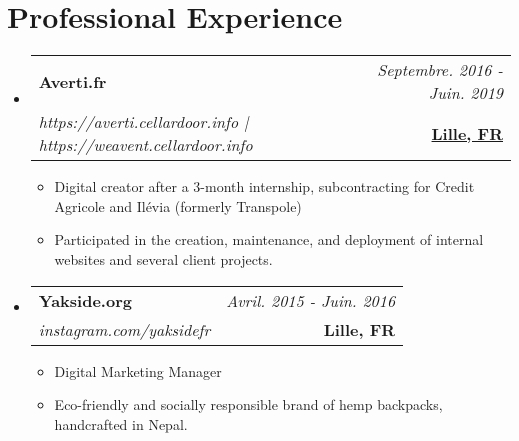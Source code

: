 \documentclass[a4paper,11pt]{article}
\makeatletter
\newcommand{\resumeProject}[4]{
\vspace{0.5mm}\item
    \begin{tabular*}{0.98\textwidth}[t]{l@{\extracolsep{\fill}}r}
        \textbf{#1} & \textit{\footnotesize{#3}} \\
        \footnotesize{\textit{#2}} & \footnotesize{#4}
    \end{tabular*}
    \vspace{-2.4mm}
}
\newcommand{\resumeSubHeadingListStart}{\begin{itemize}[leftmargin=*,labelsep=0mm]}
\newcommand{\resumeItemListStart}{\begin{justify}\begin{itemize}[leftmargin=3ex, rightmargin=2ex, noitemsep,labelsep=1.2mm,itemsep=0mm]\small}
\newcommand{\resumeSubHeadingListEnd}{\end{itemize}\vspace{2mm}}
\newcommand{\resumeItemListEnd}{\end{itemize}\end{justify}\vspace{-2mm}}
\makeatother
\begin{document}
\section{\textbf{Professional Experience}}
\resumeSubHeadingListStart 
    \resumeProject
      {Averti.fr} 
      {https://averti.cellardoor.info | https://weavent.cellardoor.info} 
      {Septembre. 2016 - Juin. 2019} 
      {\href{https://telerp.cellardoor.info}{\textbf{Lille, FR}}} 
      \vspace{-2mm}
      \resumeItemListStart
          \item {Digital creator after a 3-month internship, subcontracting for Credit Agricole and Ilévia (formerly Transpole)}
        \item {Participated in the creation, maintenance, and deployment of internal websites and several client projects.}
      \resumeItemListEnd
          \vspace{-3mm}
    \resumeProject
      {Yakside.org} 
    {instagram.com/yaksidefr} 
      {Avril. 2015 - Juin. 2016} 
      {{\textbf{Lille, FR}}} 
      \vspace{-2mm}
      \resumeItemListStart
        \item {Digital Marketing Manager}
        \item {Eco-friendly and socially responsible brand of hemp backpacks, handcrafted in Nepal.}
      \resumeItemListEnd
     \vspace{-2mm}
\resumeSubHeadingListEnd
\vspace{-7mm}
\end{document}

